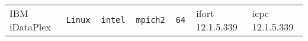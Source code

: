 \begin{longtable}{lllllll}
IBM iDataPlex         &\tt Linux  &\tt intel        &\tt mpich2     &\tt 64              & ifort \footnotesize 12.1.5.339     & icpc \footnotesize 12.1.5.339   \\ %

\end{longtable}
